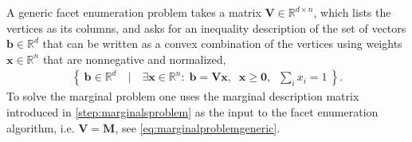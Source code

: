 {A generic facet enumeration problem takes a matrix $\bm{V}\in\mathbb{R}^{d\times n}$, which lists the vertices as its columns, and asks for an inequality description of the set of vectors $\bm{b}\in\mathbb{R}^d$ that can be written as a convex combination of the vertices using weights $\bm{x}\in\mathbb{R}^n$ that are nonnegative and normalized,
\begin{align}
	\label{projsimplex}
	\left\{\: \bm{b}\in\mathbb{R}^d \quad\bigg|\quad \exists \bm{x}\in\mathbb{R}^n:\; \bm{b} = \bm{V}\bm{x} ,\;\; \bm{x}\geq \bm{0},\;\; {{\sum_i}{x_i}}=1 \:\right\}.
\end{align}
To solve the marginal problem one uses the marginal description matrix introduced in \cref{step:marginalsproblem} as the input to the facet enumeration algorithm, i.e. $\bm{V}=\bm{M}$, see \cref{eq:marginalproblemgeneric}.

}
